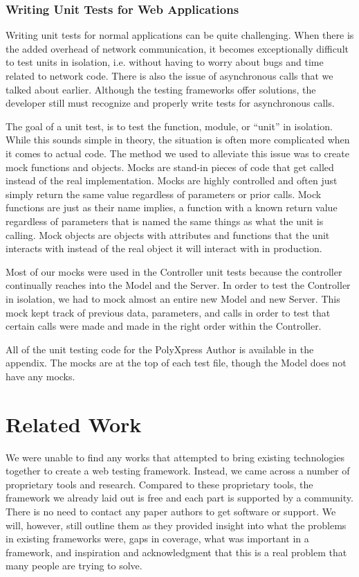 \documentclass[12pt]{ucthesis}
\begin{document}
\subsection{Writing Unit Tests for Web Applications}
Writing unit tests for normal applications can be quite challenging. When there is the added overhead of network communication, it becomes exceptionally difficult to test units in isolation, i.e. without having to worry about bugs and time related to network code. There is also the issue of asynchronous calls that we talked about earlier. Although the testing frameworks offer solutions, the developer still must recognize and properly write tests for asynchronous calls.

The goal of a unit test, is to test the function, module, or ``unit'' in isolation. While this sounds simple in theory, the situation is often more complicated when it comes to actual code. The method we used to alleviate this issue was to create mock functions and objects. Mocks are stand-in pieces of code that get called instead of the real implementation. Mocks are highly controlled and often just simply return the same value regardless of parameters or prior calls. Mock functions are just as their name implies, a function with a known return value regardless of parameters that is named the same things as what the unit is calling. Mock objects are objects with attributes and functions that the unit interacts with instead of the real object it will interact with in production.

Most of our mocks were used in the Controller unit tests because the controller continually reaches into the Model and the Server. In order to test the Controller in isolation, we had to mock almost an entire new Model and new Server. This mock kept track of previous data, parameters, and calls in order to test that certain calls were made and made in the right order within the Controller.

All of the unit testing code for the PolyXpress Author is available in the appendix. The mocks are at the top of each test file, though the Model does not have any mocks.

\chapter{Related Work}
We were unable to find any works that attempted to bring existing technologies together to create a web testing framework. Instead, we came across a number of proprietary tools and research. Compared to these proprietary tools, the framework we already laid out is free and each part is supported by a community. There is no need to contact any paper authors to get software or support. We will, however, still outline them as they provided insight into what the problems in existing frameworks were, gaps in coverage, what was important in a framework, and inspiration and acknowledgment that this is a real problem that many people are trying to solve.
\end{document}
